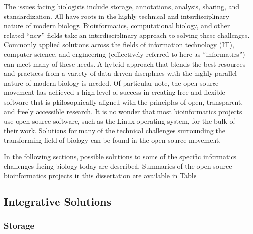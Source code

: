 {%
The issues facing biologists include storage, annotations, analysis, sharing, and
standardization.  All have roots in the highly technical and interdisciplinary
nature of modern biology.  Bioinformatics, computational biology, and other
related ``new'' fields take an interdisciplinary approach to solving these
challenges.  Commonly applied solutions across the fields of information
technology (IT), computer science, and engineering (collectively referred to
here as ``informatics'') can meet many of these needs.  A hybrid
approach that blends the best resources and practices from a variety
of data driven disciplines with the highly parallel nature of modern biology is needed.
Of particular note, the open source movement has achieved a high level of
success in creating free and flexible software that is philosophically aligned
with the principles of open, transparent, and freely accessible research.  It
is no wonder that most bioinformatics projects use open source software, such
as the Linux operating system, for the bulk of their work.  Solutions for many
of the technical challenges surrounding the transforming field of biology can
be found in the open source movement.

In the following sections, possible solutions to some of the specific informatics
challenges facing biology today are described. Summaries of the open source
bioinformatics projects in this dissertation are available in Table %


\subsection{Integrative Solutions}

\subsubsection{Storage}

}
